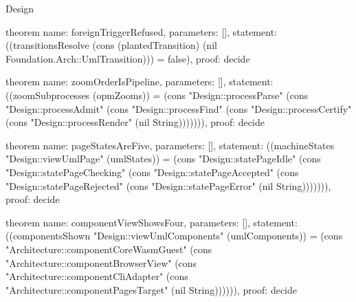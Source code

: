 \begin{lexlean}{Design}
\begin{semanticmodule}
theorem{
  name: foreignTriggerRefused,
  parameters: [],
  statement: ((transitionsResolve (cons (plantedTransition) (nil Foundation.Arch::UmlTransition))) = false),
  proof: decide{}
}

theorem{
  name: zoomOrderIsPipeline,
  parameters: [],
  statement: ((zoomSubprocesses (opmZooms)) = (cons "Design::processParse" (cons "Design::processAdmit" (cons "Design::processFind" (cons "Design::processCertify" (cons "Design::processRender" (nil String))))))),
  proof: decide{}
}

theorem{
  name: pageStatesAreFive,
  parameters: [],
  statement: ((machineStates "Design::viewUmlPage" (umlStates)) = (cons "Design::statePageIdle" (cons "Design::statePageChecking" (cons "Design::statePageAccepted" (cons "Design::statePageRejected" (cons "Design::statePageError" (nil String))))))),
  proof: decide{}
}

theorem{
  name: componentViewShowsFour,
  parameters: [],
  statement: ((componentsShown "Design::viewUmlComponents" (umlComponents)) = (cons "Architecture::componentCoreWasmGuest" (cons "Architecture::componentBrowserView" (cons "Architecture::componentCliAdapter" (cons "Architecture::componentPagesTarget" (nil String)))))),
  proof: decide{}
}
\end{semanticmodule}
\end{lexlean}

